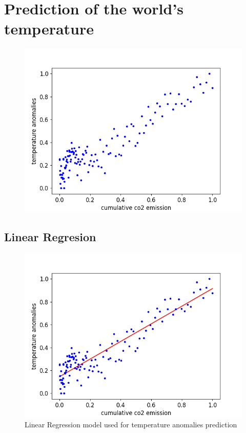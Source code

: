 \chapter{Prediction of the world's temperature}
\label{chap:two}

\begin{figure}[h]
  \includegraphics[width=\linewidth]{img/cumulative-co2-temperature.png}
  \caption{}
  \label{fig:cumulative-co2-temperature}
\end{figure}

\newpage
\section{Linear Regresion}

\begin{figure}[h]
  \includegraphics[width=\linewidth]{img/linear-regression.png}
  \caption{Linear Regression model used for temperature anomalies prediction }
  \label{fig:linear-regression}
\end{figure}

